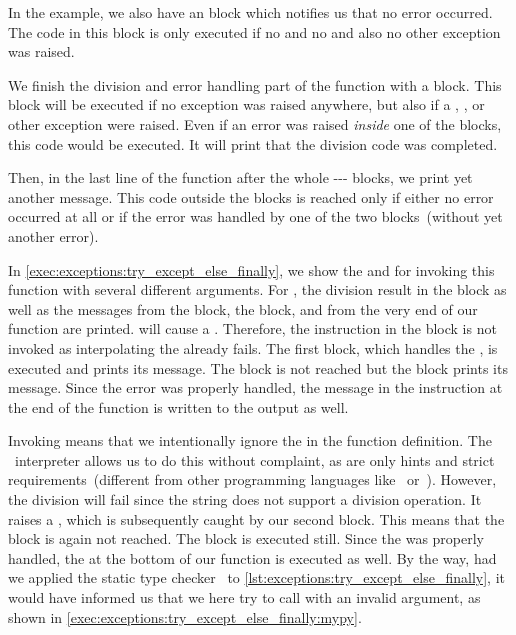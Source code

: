In the example, we also have an  block which notifies us that no error occurred.
The code in this block is only executed if no  and no  and also no other exception was raised.

We finish the division and error handling part of the function with a  block.
This block will be executed if no exception was raised anywhere, but also if a , , or other exception were raised.
Even if an error was raised \emph{inside} one of the  blocks, this code would be executed.
It will print that the division code was completed.

Then, in the last line of the function after the whole --- blocks, we print yet another message.
This code outside the blocks is reached only if either no error occurred at all or if the error was handled by one of the two  blocks~(without yet another error).

In \cref{exec:exceptions:try_except_else_finally}, we show the  and  for invoking this function with several different arguments.
For , the division result in the  block as well as the messages from the  block, the  block, and from the very end of our function are printed.
 will cause a .
Therefore, the  instruction in the  block is not invoked as interpolating the  already fails.
The first  block, which handles the , is executed and prints its message.
The  block is not reached but the  block prints its message.
Since the error was properly handled, the message in the  instruction at the end of the function is written to the output as well.

Invoking  means that we intentionally ignore the  in the function definition.
The \python\ interpreter allows us to do this without complaint, as  are only hints and strict requirements~(different from other programming languages like~ or~).
However, the division  will fail since the string  does not support a division operation.
It raises a , which is subsequently caught by our second  block.
This means that the  block is again not reached.
The  block is executed still.
Since the  was properly handled, the  at the bottom of our function is executed as well.
By the way, had we applied the static type checker \mypy\ to \cref{lst:exceptions:try_except_else_finally}, it would have informed us that we here try to call  with an invalid argument, as shown in \cref{exec:exceptions:try_except_else_finally:mypy}.

